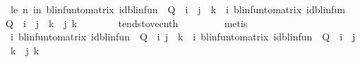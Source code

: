 \begin{isabellebody}
\ le{}{\isacharcolon}{\kern0pt}\ {\isachardoublequoteopen}{\isacharparenleft}{\kern0pt}{\isasymlambda}n{\isachardot}{\kern0pt}\ {\isacharparenleft}{\kern0pt}{\isasymSum}i{\isacharless}{\kern0pt}n{\isachardot}{\kern0pt}\ blinfun{\isacharunderscore}{\kern0pt}to{\isacharunderscore}{\kern0pt}matrix\ {\isacharparenleft}{\kern0pt}{\isacharparenleft}{\kern0pt}id{\isacharunderscore}{\kern0pt}blinfun\ {\isacharminus}{\kern0pt}\ Q{}{\isacharparenright}{\kern0pt}\ {\isacharcircum}{\kern0pt}{\isacharcircum}{\kern0pt}\ i{\isacharparenright}{\kern0pt}{\isacharparenright}{\kern0pt}\ {\isachardollar}{\kern0pt}\ j\ {\isachardollar}{\kern0pt}\ k{\isacharparenright}{\kern0pt}\ {\isasymlonglonglongrightarrow}\ {\isacharparenleft}{\kern0pt}{\isasymSum}i{\isachardot}{\kern0pt}\ blinfun{\isacharunderscore}{\kern0pt}to{\isacharunderscore}{\kern0pt}matrix\ {\isacharparenleft}{\kern0pt}{\isacharparenleft}{\kern0pt}id{\isacharunderscore}{\kern0pt}blinfun\ {\isacharminus}{\kern0pt}\ Q{}{\isacharparenright}{\kern0pt}\ {\isacharcircum}{\kern0pt}{\isacharcircum}{\kern0pt}\ i{\isacharparenright}{\kern0pt}{\isacharparenright}{\kern0pt}\ {\isachardollar}{\kern0pt}\ j\ {\isachardollar}{\kern0pt}\ k{\isachardoublequoteclose}\ \ j\ k\isanewline
\ \ \ \ \ \ \isamarkupfalse%
\ tendsto{\isacharunderscore}{\kern0pt}vec{\isacharunderscore}{\kern0pt}nth\ \isanewline
\ \ \ \ \ \ \isamarkupfalse%
\ metis\isanewline
\ \ \ \ \isamarkupfalse%
\ {\isachardoublequoteopen}{\isacharparenleft}{\kern0pt}{\isacharparenleft}{\kern0pt}{\isasymSum}i{\isachardot}{\kern0pt}\ blinfun{\isacharunderscore}{\kern0pt}to{\isacharunderscore}{\kern0pt}matrix\ {\isacharparenleft}{\kern0pt}{\isacharparenleft}{\kern0pt}id{\isacharunderscore}{\kern0pt}blinfun\ {\isacharminus}{\kern0pt}\ Q{}{\isacharparenright}{\kern0pt}\ {\isacharcircum}{\kern0pt}{\isacharcircum}{\kern0pt}\ i{\isacharparenright}{\kern0pt}{\isacharparenright}{\kern0pt}{\isachardollar}{\kern0pt}\ j\ {\isachardollar}{\kern0pt}\ k{\isacharparenright}{\kern0pt}\ {\isasymle}\ {\isacharparenleft}{\kern0pt}{\isacharparenleft}{\kern0pt}{\isasymSum}i{\isachardot}{\kern0pt}\ blinfun{\isacharunderscore}{\kern0pt}to{\isacharunderscore}{\kern0pt}matrix\ {\isacharparenleft}{\kern0pt}{\isacharparenleft}{\kern0pt}id{\isacharunderscore}{\kern0pt}blinfun\ {\isacharminus}{\kern0pt}\ Q{}{\isacharparenright}{\kern0pt}\ {\isacharcircum}{\kern0pt}{\isacharcircum}{\kern0pt}\ i{\isacharparenright}{\kern0pt}{\isacharparenright}{\kern0pt}\ {\isachardollar}{\kern0pt}\ j\ {\isachardollar}{\kern0pt}\ k{\isacharparenright}{\kern0pt}{\isachardoublequoteclose}\ \ j\ k\isanewline

\end{isabellebody}
